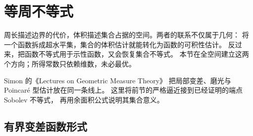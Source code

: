 \section{等周不等式}
\label{b1:sec:2706}

周长描述边界的代价，体积描述集合占据的空间。两者的联系不仅属于几何：
将一个函数拆成超水平集，集合的体积估计就能转化为函数的可积性估计。
反过来，把函数不等式用于示性函数，又会恢复集合不等式。
本节在全空间建立这两个方向；所得常数只依赖维数，未必最优。

\ProseParagraphBreak

Simon 的《Lectures on Geometric Measure Theory》\cite[\S6, pp. 34--40]{Simon1983Lectures}
把局部变差、磨光与 Poincaré 型估计放在同一条线上。
这里将前节的严格逼近接到已经证明的端点 Sobolev 不等式，
再用余面积公式说明其集合意义。


\subsection{有界变差函数形式}
\label{b1:subsec:270601}

